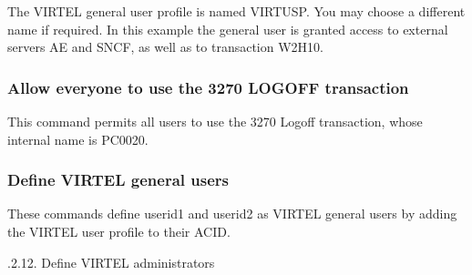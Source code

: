 \documentclass[letterpaper,10pt,english]{sphinxmanual}
\begin{document}
\sphinxAtStartPar
{}

\sphinxAtStartPar
The VIRTEL general user profile is named VIRTUSP. You may choose a different name if required. In this example the general user is granted access to external servers AE and SNCF, as well as to transaction W2H\sphinxhyphen{}10.


\subsubsection{Allow everyone to use the 3270 LOGOFF transaction}
\label{\detokenize{Installation_Guide:allow-everyone-to-use-the-3270-logoff-transaction}}
\begin{sphinxVerbatim}[commandchars=\\\{\}]
  
\end{sphinxVerbatim}

\sphinxAtStartPar
{}

\sphinxAtStartPar
This command permits all users to use the 3270 Logoff transaction, whose internal name is PC\sphinxhyphen{}0020.


\subsubsection{Define VIRTEL general users}
\label{\detokenize{Installation_Guide:define-virtel-general-users}}
\begin{sphinxVerbatim}[commandchars=\\\{\}]
  
  
\end{sphinxVerbatim}

\sphinxAtStartPar
{}

\sphinxAtStartPar
These commands define userid1 and userid2 as VIRTEL general users by adding the VIRTEL user profile to their ACID.

.2.12. Define VIRTEL administrators

\begin{sphinxVerbatim}[commandchars=\\\{\}]
  
  
\end{sphinxVerbatim}
\end{document}
